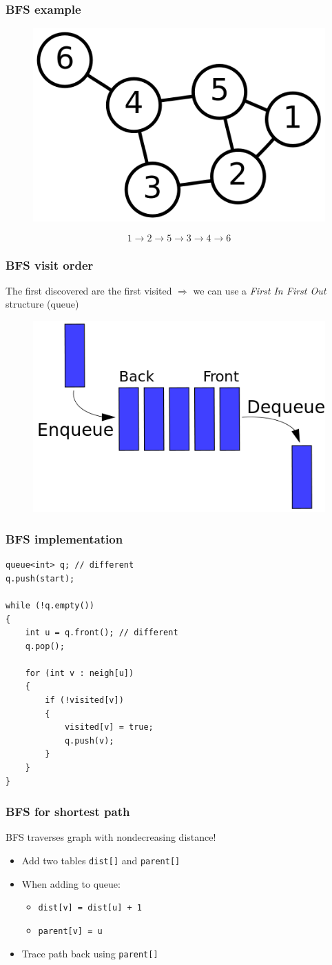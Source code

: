 \documentclass[12pt]{beamer}
\begin{document}
\begin{frame}
\frametitle{BFS example}
\begin{figure}
\centering
\includegraphics[width=.5\linewidth]{img/6n-graph}
\end{figure}
\[ 1 \to 2 \to 5 \to 3 \to 4 \to 6 \]
\end{frame}

\begin{frame}
\frametitle{BFS visit order}
The first discovered are the first visited $\Rightarrow$ we can use a \emph{First In First Out} structure (queue)
\begin{figure}
\centering
\includegraphics[width=.6\linewidth]{img/queue}
\end{figure}
\end{frame}

\begin{frame}[fragile]
\frametitle{BFS implementation}
\begin{lstlisting}
queue<int> q; // different
q.push(start);

while (!q.empty())
{
    int u = q.front(); // different
    q.pop();
    
    for (int v : neigh[u])
    {
        if (!visited[v])
        {
            visited[v] = true;
            q.push(v);
        }
    }
}
\end{lstlisting}
\end{frame}

\begin{frame}
\frametitle{BFS for shortest path}
BFS traverses graph with nondecreasing distance!
\begin{itemize}
\item Add two tables \texttt{dist[]} and \texttt{parent[]}
\item When adding to queue:
    \begin{itemize}
    \item \lstinline[basicstyle=\normalsize]{dist[v] = dist[u] + 1}
    \item \lstinline[basicstyle=\normalsize]{parent[v] = u}
    \end{itemize}
\item Trace path back using \texttt{parent[]}
\end{itemize}
\end{frame}
\end{document}
